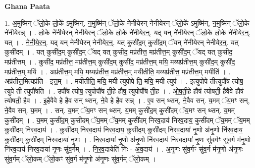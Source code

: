 \documentclass[17pt]{extarticle}
\begin{document}
\textbf{Ghana Paata } \newline

1. अ॒मुष्मि॑न् ॅलो॒के लो॒के॑ ऽमुष्मि॑न्, न॒मुष्मि॑न् ॅलो॒के ने॑नीयेरन् नेनीयेरन् ॅलो॒के॑ ऽमुष्मि॑न्, न॒मुष्मि॑न् ॅलो॒के ने॑नीयेरन्न् । . लो॒के ने॑नीयेरन् नेनीयेरन् ॅलो॒के लो॒के ने॑नीयेर॒न्॒. यद् यन् ने॑नीयेरन् ॅलो॒के लो॒के ने॑नीयेर॒न्॒. यत् । . ने॒नी॒ये॒र॒न्॒. यद् यन् ने॑नीयेरन् नेनीयेर॒न्॒. यत् कुसी॑द॒म् कुसी॑द॒म् ॅयन् ने॑नीयेरन् नेनीयेर॒न्॒. यत् कुसी॑दम् । . यत् कुसी॑द॒म् कुसी॑द॒म् ॅयद् यत् कुसी॑द॒ मप्र॑तीत्त॒ मप्र॑तीत्त॒म् कुसी॑द॒म् ॅयद् यत् कुसी॑द॒ मप्र॑तीत्तम् । . कुसी॑द॒ मप्र॑तीत्त॒ मप्र॑तीत्त॒म् कुसी॑द॒म् कुसी॑द॒ मप्र॑तीत्त॒म् मयि॒ मय्यप्र॑तीत्त॒म् कुसी॑द॒म् कुसी॑द॒ मप्र॑तीत्त॒म् मयि॑ । . अप्र॑तीत्त॒म् मयि॒ मय्यप्र॑तीत्त॒ मप्र॑तीत्त॒म् मयीतीति॒ मय्यप्र॑तीत्त॒ मप्र॑तीत्त॒म् मयीति॑ । . अप्र॑तीत्त॒मित्यप्र॑ति - इ॒त्त॒म् । . मयीतीति॒ मयि॒ मयी त्युपोपे ति॒ मयि॒ मयी त्युप॑ । . इत्युपोपे तीत्युपौ॑ष त्योष॒ त्युपे ती त्युपौ॑षति । . उपौ॑ष त्योष॒ त्युपोपौ॑ष ती॒हे हौष॒ त्युपोपौ॑ष ती॒ह । . ओ॒ष॒ती॒हे हौष॑ त्योषती॒ हैवैवे हौष॑ त्योषती॒ हैव । . इ॒हैवैवे हे हैव सन् थ्सन्, ने॒वे हे हैव सन्न् । . ए॒व सन् थ्सन्, ने॒वैव सन्. य॒मम् ॅय॒मꣳ सन्, ने॒वैव सन्. य॒मम् । . सन्. य॒मम् ॅय॒मꣳ सन् थ्सन्. य॒मम् कुसी॑द॒म् कुसी॑दम् ॅय॒मꣳ सन् थ्सन्. य॒मम् कुसी॑दम् । . य॒मम् कुसी॑द॒म् कुसी॑दम् ॅय॒मम् ॅय॒मम् कुसी॑दम् निरव॒दाय॑ निरव॒दाय॒ कुसी॑दम् ॅय॒मम् ॅय॒मम् कुसी॑दम् निरव॒दाय॑ । . कुसी॑दम् निरव॒दाय॑ निरव॒दाय॒ कुसी॑द॒म् कुसी॑दम् निरव॒दाया॑ नृ॒णो अ॑नृ॒णो नि॑रव॒दाय॒ कुसी॑द॒म् कुसी॑दम् निरव॒दाया॑ नृ॒णः । . नि॒र॒व॒दाया॑ नृ॒णो अ॑नृ॒णो नि॑रव॒दाय॑ निरव॒दाया॑ नृ॒णः सु॑व॒र्गꣳ सु॑व॒र्ग म॑नृ॒णो नि॑रव॒दाय॑ निरव॒दाया॑ नृ॒णः सु॑व॒र्गम् । . नि॒र॒व॒दायेति॑ निः - अ॒व॒दाय॑ । . अ॒नृ॒णः सु॑व॒र्गꣳ सु॑व॒र्ग म॑नृ॒णो अ॑नृ॒णः सु॑व॒र्गम् ॅलो॒कम् ॅलो॒कꣳ सु॑व॒र्ग म॑नृ॒णो अ॑नृ॒णः सु॑व॒र्गम् ॅलो॒कम् । \newline
\end{document}
